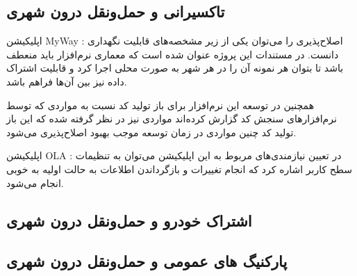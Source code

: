 \subsection{تاکسیرانی و حمل‌و‌نقل درون شهری}

اپلیکیشن MyWay : اصلاح‌پذیری را می‌توان یکی از زیر مشخصه‌های قابلیت‌‌ نگهداری دانست. در مستندات این پروژه عنوان شده است که معماری نرم‌افزار باید منعطف باشد تا بتوان هر نمونه آن را در هر شهر به صورت محلی اجرا کرد و قابلیت اشتراک داده نیز بین آن‌‌ها فراهم باشد. 

همچنین در توسعه این نرم‌افزار برای باز تولید کد نسبت به مواردی که توسط نرم‌افزارهای سنجش کد گزارش کرده‌اند مواردی نیز در نظر گرفته شده که این باز تولید کد چنین مواردی در زمان توسعه موجب بهبود اصلاح‌پذیری می‌شود.

اپلیکیشن OLA : در تعیین نیازمندی‌های مربوط به این اپلیکیشن می‌توان به تنظیمات سطح کاربر اشاره کرد که انجام تغییرات و بازگرداندن اطلاعات به حالت اولیه به خوبی انجام می‌شود.


\subsection{اشتراک خودرو و حمل‌و‌نقل درون شهری}


\subsection{پارکنیگ های عمومی و حمل‌و‌نقل درون شهری}
